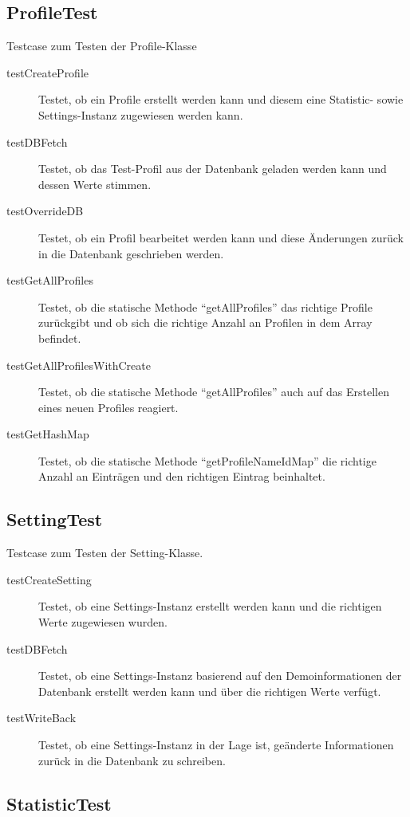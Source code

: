 \documentclass[parskip=full]{scrreprt}
\begin{document}
\subsection{ProfileTest}

Testcase zum Testen der Profile-Klasse

\begin{description}
	\item[testCreateProfile] Testet, ob ein Profile erstellt werden kann und diesem eine Statistic- sowie Settings-Instanz zugewiesen werden kann.
	\item[testDBFetch] Testet, ob das Test-Profil aus der Datenbank geladen werden kann und dessen Werte stimmen.
	\item[testOverrideDB] Testet, ob ein Profil bearbeitet werden kann und diese Änderungen zurück in die Datenbank geschrieben werden.
	\item[testGetAllProfiles] Testet, ob die statische Methode \enquote{getAllProfiles} das richtige Profile zurückgibt und ob sich die richtige Anzahl an Profilen in dem Array befindet.
	\item[testGetAllProfilesWithCreate] Testet, ob die statische Methode \enquote{getAllProfiles} auch auf das Erstellen eines neuen Profiles reagiert.
	\item[testGetHashMap] Testet, ob die statische Methode \enquote{getProfileNameIdMap} die richtige Anzahl an Einträgen und den richtigen Eintrag beinhaltet.
\end{description}

\subsection{SettingTest}

Testcase zum Testen der Setting-Klasse.

\begin{description}
	\item[testCreateSetting] Testet, ob eine Settings-Instanz erstellt werden kann und die richtigen Werte zugewiesen wurden.
	\item[testDBFetch] Testet, ob eine Settings-Instanz basierend auf den Demoinformationen der Datenbank erstellt werden kann und über die richtigen Werte verfügt.
	\item[testWriteBack] Testet, ob eine Settings-Instanz in der Lage ist, geänderte Informationen zurück in die Datenbank zu schreiben.
\end{description}

\subsection{StatisticTest}
\end{document}
